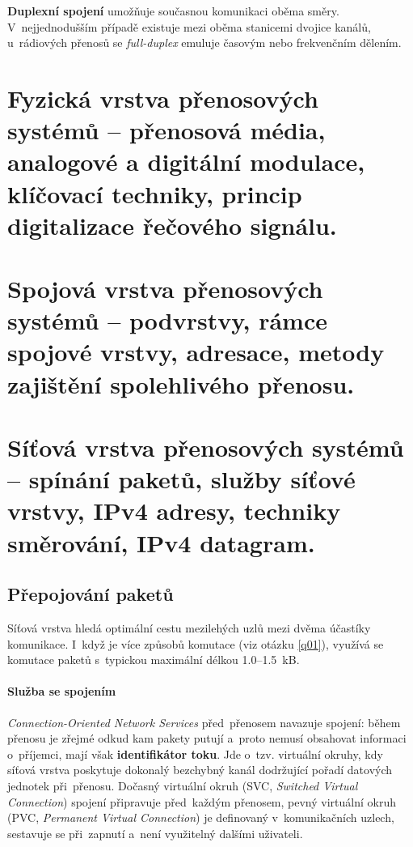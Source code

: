 \textbf{Duplexní spojení} umožňuje současnou komunikaci oběma směry. V~nejjednodušším případě existuje mezi oběma stanicemi dvojice kanálů, u~rádiových přenosů se \emph{full-duplex} emuluje časovým nebo frekvenčním dělením.

\clearpage
\section{Fyzická vrstva přenosových systémů -- přenosová média, analogové a digitální modulace, klíčovací techniky, princip digitalizace řečového signálu.}

\clearpage
\section{Spojová vrstva přenosových systémů -- podvrstvy, rámce spojové vrstvy, adresace, metody zajištění spolehlivého přenosu.}

\clearpage
\section{Síťová vrstva přenosových systémů -- spínání paketů, služby síťové vrstvy, IPv4 adresy, techniky směrování, IPv4 datagram.}

\subsection{Přepojování paketů}

Síťová vrstva hledá optimální cestu mezilehých uzlů mezi dvěma účastíky komunikace. I~když je více způsobů komutace (viz otázku \ref{q01}), využívá se komutace paketů s~typickou maximální délkou 1.0--1.5~kB.

\paragraph{Služba se spojením} \emph{Connection-Oriented Network Services} před~přenosem navazuje spojení: během přenosu je zřejmé odkud kam pakety putují a~proto nemusí obsahovat informaci o~příjemci, mají však \textbf{identifikátor toku}. Jde o~tzv. virtuální okruhy, kdy síťová vrstva poskytuje dokonalý bezchybný kanál dodržující pořadí datových jednotek při~přenosu. Dočasný virtuální okruh (SVC, \emph{Switched Virtual Connection}) spojení připravuje před~každým přenosem, pevný virtuální okruh (PVC, \emph{Permanent Virtual Connection}) je definovaný v~komunikačních uzlech, sestavuje se při~zapnutí a~není využitelný dalšími uživateli.

